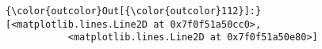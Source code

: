 \documentclass[11pt]{article}
\begin{document}
\begin{Verbatim}[commandchars=\\\{\}]
{\color{outcolor}Out[{\color{outcolor}112}]:} [<matplotlib.lines.Line2D at 0x7f0f51a50cc0>,
           <matplotlib.lines.Line2D at 0x7f0f51a50e80>]
\end{Verbatim}
            
    \begin{center}
    \end{center}
    { \hspace*{\fill} \\}
    

    
    
    
    
\end{document}
